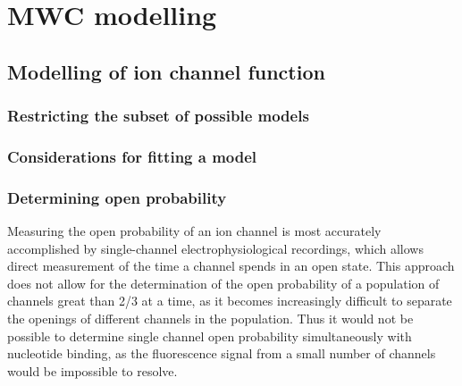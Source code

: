 \chapter{\label{ch:4}MWC modelling} 

\graphicspath{{figures/ch4/}}

\minitoc

\section{Modelling of ion channel function}

\subsection{Restricting the subset of possible models}

\subsection{Considerations for fitting a model}

\subsection{Determining open probability}
Measuring the open probability of an ion channel is most accurately accomplished by single-channel electrophysiological recordings, which allows direct measurement of the time a channel spends in an open state.
This approach does not allow for the determination of the open probability of a population of channels great than 2/3 at a time, as it becomes increasingly difficult to separate the openings of different channels in the population.
Thus it would not be possible to determine single channel open probability simultaneously with nucleotide binding, as the fluorescence signal from a small number of channels would be impossible to resolve.

